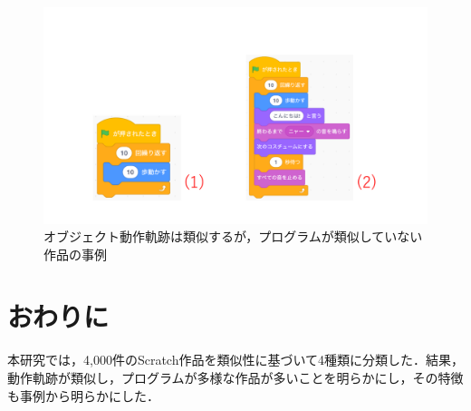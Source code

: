 \documentclass[T,J]{fose} %
\newcommand{\todo}[1]{\colorbox{yellow}{{\bf TODO}:}{\color{red} {\textbf{[#1]}}}}
\begin{document}
\begin{figure}[t]
	\centering
	\includegraphics[width=1.0\linewidth]{Okamoto_fig/pattern2-1.pdf}
	\caption{オブジェクト動作軌跡は類似するが，プログラムが類似していない作品の事例}
   \vspace{-2mm}
	\label{fig:pattern2-1}
\end{figure}




\section{おわりに}\label{sec:con}

本研究では，4,000件のScratch作品を類似性に基づいて4種類に分類した．結果，動作軌跡が類似し，プログラムが多様な作品が多いことを明らかにし，その特徴も事例から明らかにした．








\end{document}
